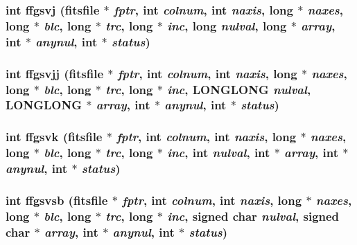 \subsubsection{\setlength{\rightskip}{0pt plus 5cm}int ffgsvj (\bf{fitsfile} $\ast$ {\em fptr}, int {\em colnum}, int {\em naxis}, long $\ast$ {\em naxes}, long $\ast$ {\em blc}, long $\ast$ {\em trc}, long $\ast$ {\em inc}, long {\em nulval}, long $\ast$ {\em array}, int $\ast$ {\em anynul}, int $\ast$ {\em status})}\label{test_2shm__client_2fitsio_8h_4dab3a6e95489f607d0e69dc0c5b0de2}


\subsubsection{\setlength{\rightskip}{0pt plus 5cm}int ffgsvjj (\bf{fitsfile} $\ast$ {\em fptr}, int {\em colnum}, int {\em naxis}, long $\ast$ {\em naxes}, long $\ast$ {\em blc}, long $\ast$ {\em trc}, long $\ast$ {\em inc}, \bf{LONGLONG} {\em nulval}, \bf{LONGLONG} $\ast$ {\em array}, int $\ast$ {\em anynul}, int $\ast$ {\em status})}\label{test_2shm__client_2fitsio_8h_b11dce310951c2540223e1e021e4257d}


\subsubsection{\setlength{\rightskip}{0pt plus 5cm}int ffgsvk (\bf{fitsfile} $\ast$ {\em fptr}, int {\em colnum}, int {\em naxis}, long $\ast$ {\em naxes}, long $\ast$ {\em blc}, long $\ast$ {\em trc}, long $\ast$ {\em inc}, int {\em nulval}, int $\ast$ {\em array}, int $\ast$ {\em anynul}, int $\ast$ {\em status})}\label{test_2shm__client_2fitsio_8h_af5457b13c2e0db0be99a6dd61c025dc}


\subsubsection{\setlength{\rightskip}{0pt plus 5cm}int ffgsvsb (\bf{fitsfile} $\ast$ {\em fptr}, int {\em colnum}, int {\em naxis}, long $\ast$ {\em naxes}, long $\ast$ {\em blc}, long $\ast$ {\em trc}, long $\ast$ {\em inc}, signed char {\em nulval}, signed char $\ast$ {\em array}, int $\ast$ {\em anynul}, int $\ast$ {\em status})}\label{test_2shm__client_2fitsio_8h_9b640c1b98ee1cca47986fc97e10171e}


